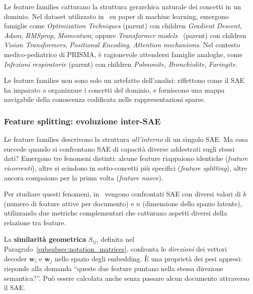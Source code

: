 Le feature families catturano la struttura gerarchica naturale dei concetti in un dominio. Nel dataset utilizzato in~\parencite{oneill2024disentangling} su paper di machine learning, emergono famiglie come \textit{Optimization Techniques} (parent) con children \textit{Gradient Descent}, \textit{Adam}, \textit{RMSprop}, \textit{Momentum}; oppure \textit{Transformer models}~\parencite{vaswani2017attention} (parent) con children \textit{Vision Transformers}, \textit{Positional Encoding}, \textit{Attention mechanisms}. Nel contesto medico-pediatrico di PRISMA, è ragionevole attendersi famiglie analoghe, come \textit{Infezioni respiratorie} (parent) con children \textit{Polmonite}, \textit{Bronchiolite}, \textit{Faringite}.

Le feature families non sono solo un artefatto dell'analisi: riflettono come il SAE ha imparato a organizzare i concetti del dominio, e forniscono una mappa navigabile della conoscenza codificata nelle rappresentazioni sparse.

\subsubsection{Feature splitting: evoluzione inter-SAE}
\label{subsubsec:feature_splitting}

Le feature families descrivono la struttura \textit{all'interno} di un singolo SAE. Ma cosa succede quando si confrontano SAE di capacità diverse addestrati sugli stessi dati? Emergono tre fenomeni distinti: alcune feature riappaiono identiche (\textit{feature ricorrenti}), altre si scindono in sotto-concetti più specifici (\textit{feature splitting}), altre ancora compaiono per la prima volta (\textit{feature nuove}).

Per studiare questi fenomeni, in~\parencite{oneill2024disentangling} vengono confrontati SAE con diversi valori di $k$ (numero di feature attive per documento) e $n$ (dimensione dello spazio latente), utilizzando due metriche complementari che catturano aspetti diversi della relazione tra feature.

La \textbf{similarità geometrica} $S_{ij}$, definita nel Paragrafo~\ref{subsubsec:notation_matrices}, confronta le \textit{direzioni} dei vettori decoder $\mathbf{w}_i$ e $\mathbf{w}_j$ nello spazio degli embedding. È una proprietà dei pesi appresi: risponde alla domanda ``queste due feature puntano nella stessa direzione semantica?''. Può essere calcolata anche senza passare alcun documento attraverso il SAE.

